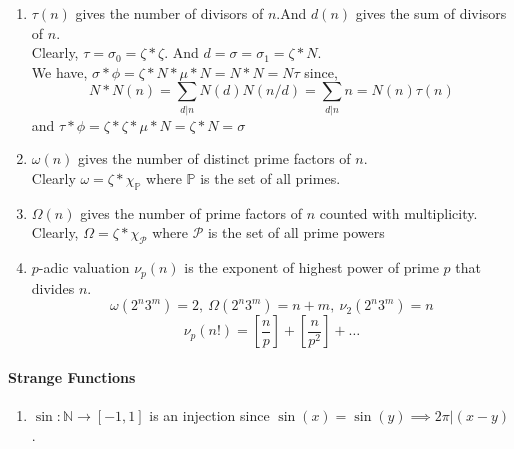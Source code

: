 \begin{enumerate}
	\item $\tau(n)$ gives the number of divisors of $n$.And $d(n)$ gives the sum of divisors of $n$.\\
		Clearly, $\tau = \sigma_0 = \zeta \ast \zeta$. And $d = \sigma = \sigma_1 = \zeta \ast N$.\\
	We have, $\sigma \ast \phi = \zeta \ast N \ast \mu \ast N =  N \ast N = N \tau$ since,
		$$ N \ast N(n)= \sum_{d|n} N(d)N(n/d) = \sum_{d|n} n = N(n) \tau(n)$$
	and $\tau \ast \phi = \zeta \ast \zeta \ast \mu \ast N = \zeta \ast N = \sigma$
	\item $\omega(n)$ gives the number of distinct prime factors of $n$.\\
	Clearly $\omega = \zeta \ast \chi_\mathbb{P}$ where $\mathbb{P}$ is the set of all primes.
	\item $\Omega(n)$ gives the number of prime factors of $n$ counted with multiplicity.
	Clearly, $\Omega = \zeta \ast \chi_\mathcal{P}$ where $\mathcal{P}$ is the set of all prime powers 
	\item $p$-adic valuation $\nu_p(n)$ is the exponent of highest power of prime $p$ that divides $n$.
	$$ \omega(2^n3^m) = 2,\ \Omega(2^n 3^m)=n+m,\ \nu_2(2^n3^m)=n$$
	$$\nu_p(n!) = \left[\frac{n}{p}\right] + \left[\frac{n}{p^2}\right] + \dots$$
\end{enumerate}
\paragraph{Strange Functions}
\begin{enumerate}
	\item $\sin : \mathbb{N} \to [-1,1]$ is an injection since $\sin (x) = \sin (y) \implies 2\pi | (x-y)$.
\end{enumerate}
